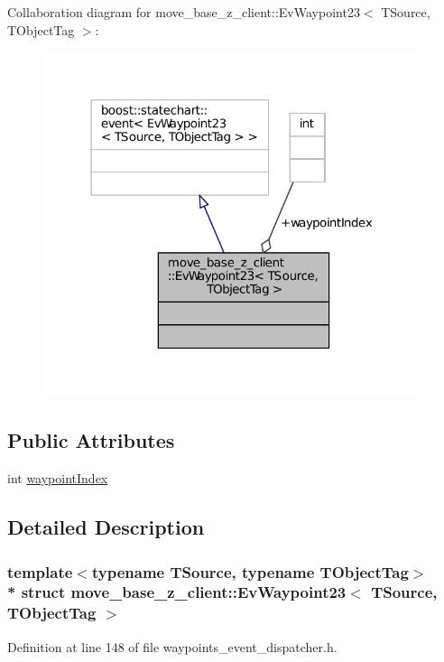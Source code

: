Collaboration diagram for move\+\_\+base\+\_\+z\+\_\+client\+:\+:Ev\+Waypoint23$<$ T\+Source, T\+Object\+Tag $>$\+:
\nopagebreak
\begin{figure}[H]
\begin{center}
\leavevmode
\includegraphics[width=314pt]{structmove__base__z__client_1_1EvWaypoint23__coll__graph}
\end{center}
\end{figure}
\subsection*{Public Attributes}
\begin{DoxyCompactItemize}
\item 
int \hyperlink{structmove__base__z__client_1_1EvWaypoint23_a97dd521f5395cfd7b5cc4bb84ece442e}{waypoint\+Index}
\end{DoxyCompactItemize}


\subsection{Detailed Description}
\subsubsection*{template$<$typename T\+Source, typename T\+Object\+Tag$>$\\*
struct move\+\_\+base\+\_\+z\+\_\+client\+::\+Ev\+Waypoint23$<$ T\+Source, T\+Object\+Tag $>$}



Definition at line 148 of file waypoints\+\_\+event\+\_\+dispatcher.\+h.



